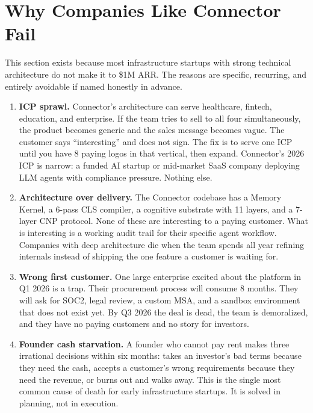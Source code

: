 \section*{Why Companies Like Connector Fail}

This section exists because most infrastructure startups with strong
technical architecture do not make it to \$1M ARR. The reasons are specific,
recurring, and entirely avoidable if named honestly in advance.

\begin{enumerate}[leftmargin=1.8em, itemsep=6pt]

  \item \textbf{ICP sprawl.}\;
    Connector's architecture can serve healthcare, fintech, education, and
    enterprise. If the team tries to sell to all four simultaneously, the
    product becomes generic and the sales message becomes vague. The
    customer says ``interesting'' and does not sign. The fix is to serve
    one ICP until you have 8 paying logos in that vertical, then expand.
    Connector's 2026 ICP is narrow: a funded AI startup or mid-market SaaS
    company deploying LLM agents with compliance pressure. Nothing else.

  \item \textbf{Architecture over delivery.}\;
    The Connector codebase has a Memory Kernel, a 6-pass CLS compiler, a
    cognitive substrate with 11 layers, and a 7-layer CNP protocol. None
    of these are interesting to a paying customer. What is interesting is
    a working audit trail for their specific agent workflow. Companies with
    deep architecture die when the team spends all year refining internals
    instead of shipping the one feature a customer is waiting for.

  \item \textbf{Wrong first customer.}\;
    One large enterprise excited about the platform in Q1 2026 is a trap.
    Their procurement process will consume 8 months. They will ask for
    SOC2, legal review, a custom MSA, and a sandbox environment that does
    not exist yet. By Q3 2026 the deal is dead, the team is demoralized,
    and they have no paying customers and no story for investors.

  \item \textbf{Founder cash starvation.}\;
    A founder who cannot pay rent makes three irrational decisions within
    six months: takes an investor's bad terms because they need the cash,
    accepts a customer's wrong requirements because they need the revenue,
    or burns out and walks away. This is the single most common cause of
    death for early infrastructure startups. It is solved in planning, not
    in execution.


\end{enumerate}
